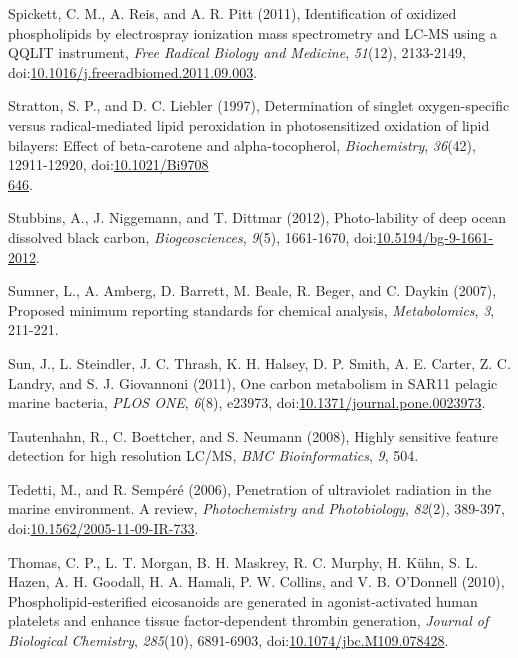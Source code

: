 \begin{singlespace}
{{Spickett, C. M., A. Reis, and A. R. Pitt (2011), Identification of oxidized phospholipids by electrospray ionization mass spectrometry and LC-MS using a QQLIT instrument, \emph{Free Radical Biology and Medicine}, \emph{51}(12), 2133-2149, doi:\href{http://dx.doi.org/10.1016/j.freeradbiomed.2011.09.003}{10.1016/j.freeradbiomed.2011.09.003}.

Stratton, S. P., and D. C. Liebler (1997), Determination of singlet oxygen-specific versus radical-mediated lipid peroxidation in photosensitized oxidation of lipid bilayers: Effect of beta-carotene and alpha-tocopherol, \emph{Biochemistry}, \emph{36}(42), 12911-12920, doi:\href{http://dx.doi.org/10.1021/Bi9708646}{10.1021/Bi9708\\646}.

Stubbins, A., J. Niggemann, and T. Dittmar (2012), Photo-lability of deep ocean dissolved black carbon, \emph{Biogeosciences}, \emph{9}(5), 1661-1670, doi:\href{http://dx.doi.org/10.5194/bg-9-1661-2012}{10.5194/bg-9-1661-2012}.

Sumner, L., A. Amberg, D. Barrett, M. Beale, R. Beger, and C. Daykin (2007), Proposed minimum reporting standards for chemical analysis, \emph{Metabolomics}, \emph{3}, 211-221.

Sun, J., L. Steindler, J. C. Thrash, K. H. Halsey, D. P. Smith, A. E. Carter, Z. C. Landry, and S. J. Giovannoni (2011), One carbon metabolism in SAR11 pelagic marine bacteria, \emph{PLOS ONE}, \emph{6}(8), e23973, doi:\href{http://dx.doi.org/10.1371/journal.pone.0023973}{10.1371/journal.pone.0023973}.

Tautenhahn, R., C. Boettcher, and S. Neumann (2008), Highly sensitive feature detection for high resolution LC/MS, \emph{BMC Bioinformatics}, \emph{9}, 504.

Tedetti, M., and R. Semp\'{e}r\'{e} (2006), Penetration of ultraviolet radiation in the marine environment. A review, \emph{Photochemistry and Photobiology}, \emph{82}(2), 389-397, doi:\href{http://dx.doi.org/10.1562/2005-11-09-IR-733}{10.1562/2005-11-09-IR-733}.

Thomas, C. P., L. T. Morgan, B. H. Maskrey, R. C. Murphy, H. K\"{u}hn, S. L. Hazen, A. H. Goodall, H. A. Hamali, P. W. Collins, and V. B. O'Donnell (2010), Phospholipid-esterified eicosanoids are generated in agonist-activated human platelets and enhance tissue factor-dependent thrombin generation, \emph{Journal of Biological Chemistry}, \emph{285}(10), 6891-6903, doi:\href{http://dx.doi.org/10.1074/jbc.M109.078428}{10.1074/jbc.M109.078428}.

}}
\end{singlespace}
